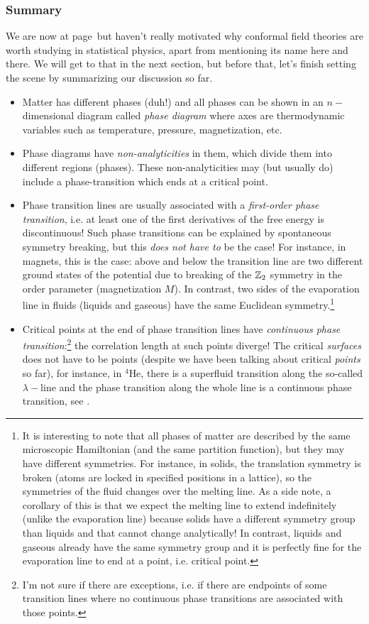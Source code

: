 \documentclass[12pt]{article}
\numberwithin{equation}{section}
\begin{document}
\subsubsection{Summary}
We are now at page~\thepage\;but haven't really motivated why conformal field theories are worth studying in statistical physics, apart from mentioning its name here and there. We will get to that in the next section, but before that, let's finish setting the scene by summarizing our discussion so far.
\begin{itemize}
	\item Matter has different phases (duh!) and all phases can be shown in an $n-$dimensional diagram called \emph{phase diagram} where axes are thermodynamic variables such as temperature, pressure, magnetization, etc.
	\item Phase diagrams have \emph{non-analyticities} in them, which divide them into different regions (phases). These non-analyticities may (but usually do) include a phase-transition which ends at a critical point.
	\item Phase transition lines are usually associated with a \emph{first-order phase transition}, i.e. at least one of the first derivatives of the free energy is discontinuous! Such phase transitions can be explained by spontaneous symmetry breaking, but this \emph{does not have to} be the case! For instance, in magnets, this is the case: above and below the transition line are two different ground states of the potential due to breaking of the $\mathbb{Z}_2$ symmetry in the order parameter (magnetization $M$). In contrast, two sides of the evaporation line in fluids (liquids and gaseous) have the same Euclidean symmetry.\footnote{It is interesting to note that all phases of matter are described by the same microscopic Hamiltonian (and the same partition function), but they may have different symmetries. For instance, in solids, the translation symmetry is broken (atoms are locked in specified positions in a lattice), so the symmetries of the fluid changes over the melting line. As a side note, a corollary of this is that we expect the melting line to extend indefinitely (unlike the evaporation line) because solids have a different symmetry group than liquids and that cannot change analytically! In contrast, liquids and gaseous already have the same symmetry group and it is perfectly fine for the evaporation line to end at a point, i.e. critical point.
}
	\item Critical points at the end of phase transition lines have \emph{continuous phase transition}:\footnote{I'm not sure if there are exceptions, i.e. if there are endpoints of some transition lines where no continuous phase transitions are associated with those points.} the correlation length at such points diverge! The critical \emph{surfaces} does not have to be points (despite we have been talking about critical \emph{points} so far), for instance, in $^{4}$He, there is a superfluid transition along the so-called $\lambda-$line and the phase transition along the whole line is a continuous phase transition, see \figref{\ref{fig: lambda line}}.
	

\end{itemize}
\end{document}
